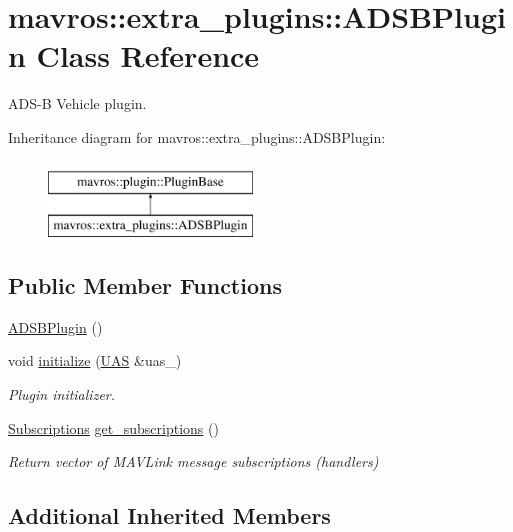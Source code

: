 \hypertarget{classmavros_1_1extra__plugins_1_1ADSBPlugin}{}\section{mavros\+::extra\+\_\+plugins\+::A\+D\+S\+B\+Plugin Class Reference}
\label{classmavros_1_1extra__plugins_1_1ADSBPlugin}


A\+D\+S-\/B Vehicle plugin.  


Inheritance diagram for mavros\+::extra\+\_\+plugins\+::A\+D\+S\+B\+Plugin\+:\begin{figure}[H]
\begin{center}
\leavevmode
\includegraphics[height=2.000000cm]{classmavros_1_1extra__plugins_1_1ADSBPlugin}
\end{center}
\end{figure}
\subsection*{Public Member Functions}
\begin{DoxyCompactItemize}
\item 
\mbox{\hyperlink{group__plugin_ga1731629adbcab3ef7d49e6b838453c0c}{A\+D\+S\+B\+Plugin}} ()
\item 
void \mbox{\hyperlink{group__plugin_ga15664310460e851e8bb761ce18c68677}{initialize}} (\mbox{\hyperlink{classmavros_1_1UAS}{U\+AS}} \&uas\+\_\+)
\begin{DoxyCompactList}\small\item\em Plugin initializer. \end{DoxyCompactList}\item 
\mbox{\hyperlink{group__plugin_ga8967d61fc77040e0c3ea5a4585d62a09}{Subscriptions}} \mbox{\hyperlink{group__plugin_gac151290664f8ba679ec27bd8c55b031e}{get\+\_\+subscriptions}} ()
\begin{DoxyCompactList}\small\item\em Return vector of M\+A\+V\+Link message subscriptions (handlers) \end{DoxyCompactList}\end{DoxyCompactItemize}
\subsection*{Additional Inherited Members}


